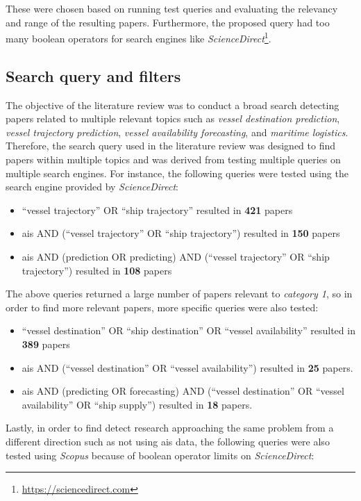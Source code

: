 These were chosen based on running test queries and evaluating the relevancy and range of the resulting papers. Furthermore, the proposed query had too many boolean operators for search engines like \textit{ScienceDirect}\footnote{\url{https://sciencedirect.com}}.

\subsection{Search query and filters}

The objective of the literature review was to conduct a broad search detecting papers related to multiple relevant topics such as \textit{vessel destination prediction}, \textit{vessel trajectory prediction}, \textit{vessel availability forecasting}, and \textit{maritime logistics}. Therefore, the search query used in the literature review was designed to find papers within multiple topics and was derived from testing multiple queries on multiple search engines. For instance, the following queries were tested using the search engine provided by \textit{ScienceDirect}:

\begin{itemize}
    \item ``vessel trajectory'' OR ``ship trajectory'' resulted in \textbf{421} papers
    \item ais AND (``vessel trajectory'' OR ``ship trajectory'') resulted in \textbf{150} papers
    \item ais AND (prediction OR predicting) AND (``vessel trajectory'' OR ``ship trajectory'') resulted in \textbf{108} papers
\end{itemize}

The above queries returned a large number of papers relevant to \textit{category 1}, so in order to find more relevant papers, more specific queries were also tested:

\begin{itemize}
    \item ``vessel destination'' OR ``ship destination'' OR ``vessel availability'' resulted in \textbf{389} papers
    \item ais AND (``vessel destination'' OR ``vessel availability'') resulted in \textbf{25} papers.
    \item ais AND (predicting OR forecasting) AND (``vessel destination'' OR ``vessel availability'' OR ``ship supply'') resulted in \textbf{18} papers.
\end{itemize}

Lastly, in order to find detect research approaching the same problem from a different direction such as not using \acrshort{ais} data, the following queries were also tested using \textit{Scopus} because of boolean operator limits on \textit{ScienceDirect}:

